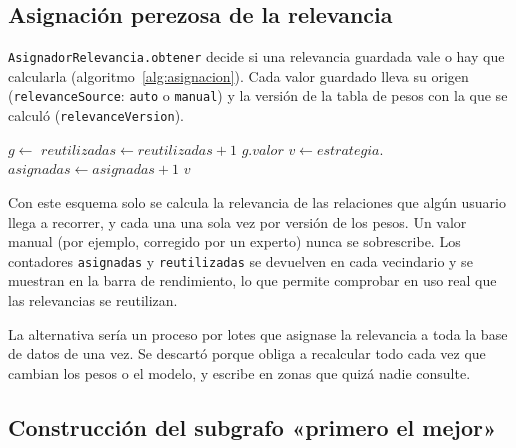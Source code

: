 \subsection{Asignación perezosa de la relevancia}
\label{sec:alg-asignacion}

\texttt{AsignadorRelevancia.obtener} decide si una relevancia guardada vale o hay que calcularla (algoritmo~\ref{alg:asignacion}). Cada valor guardado lleva su origen (\texttt{relevanceSource}: \texttt{auto} o \texttt{manual}) y la versión de la tabla de pesos con la que se calculó (\texttt{relevanceVersion}).

\begin{algorithm}[htbp]
  \caption{Obtención de la relevancia de un intermediario (\texttt{AsignadorRelevancia.obtener}).}
  \label{alg:asignacion}
  \begin{algorithmic}[1]
      \State $g \gets$  
        \State $reutilizadas \gets reutilizadas + 1$
        \State \Return $g.valor$
      \EndIf
      \State $v \gets estrategia.$
      \State {}
      \State $asignadas \gets asignadas + 1$
      \State \Return $v$
    \EndFunction
  \end{algorithmic}
\end{algorithm}

Con este esquema solo se calcula la relevancia de las relaciones que algún usuario llega a recorrer, y cada una una sola vez por versión de los pesos. Un valor manual (por ejemplo, corregido por un experto) nunca se sobrescribe. Los contadores \texttt{asignadas} y \texttt{reutilizadas} se devuelven en cada vecindario y se muestran en la barra de rendimiento, lo que permite comprobar en uso real que las relevancias se reutilizan.

La alternativa sería un proceso por lotes que asignase la relevancia a toda la base de datos de una vez. Se descartó porque obliga a recalcular todo cada vez que cambian los pesos o el modelo, y escribe en zonas que quizá nadie consulte.

\subsection{Construcción del subgrafo «primero el mejor»}
\label{sec:alg-subgrafo}

